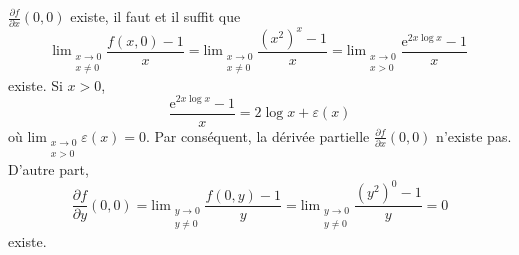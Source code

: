 {\begin{enumerate}
{$\frac{\partial f}{\partial x}(0,0)$ existe, il faut et il suffit que
\[
\mathrm{lim}_{\begin{smallmatrix} x \to 0\\ x \ne 0
\end{smallmatrix}}\frac {f(x,0) -1}x =
\mathrm{lim}_{\begin{smallmatrix} x \to 0\\ x \ne 0
\end{smallmatrix}}\frac {(x^2)^x-1}x = 
\mathrm{lim}_{\begin{smallmatrix} x \to 0\\ x > 0
\end{smallmatrix}}\frac {\mathrm e^{2x \log x} -1}x
\]
existe. Si $x>0$,
\[
\frac {\mathrm e^{2x \log x} -1}x = 2 \log x + \varepsilon(x)
\]
o\`u $\mathrm{lim}_{\begin{smallmatrix} x \to 0\\ x > 0
\end{smallmatrix}}\varepsilon(x)=0$. Par cons\'equent,
 la d\'eriv\'ee partielle
$\frac{\partial f}{\partial x}(0,0)$ n'existe pas.
D'autre part,
\[
\frac{\partial f}{\partial y}(0,0)=
\mathrm{lim}_{\begin{smallmatrix} y \to 0\\ y \ne 0
\end{smallmatrix}}\frac {f(0,y) -1}y =
\mathrm{lim}_{\begin{smallmatrix} y \to 0\\ y \ne 0
\end{smallmatrix}}\frac {(y^2)^0-1}y = 0
\]
existe.}
\end{enumerate}
}
